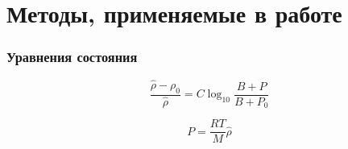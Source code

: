\section{Методы, применяемые в работе}
\begin{frame}
    \frametitle{Уравнения состояния}

    \begin{block}
         \begin{equation}
             \frac{\hat{\rho} - \rho_0}{\hat{\rho}} = C \log_{10}
             \frac{B + P}{B + P_0}
         \end{equation}
    \end{block}
    \begin{block}
\begin{equation}
    P = \frac{RT}{M} \hat{\rho}
\end{equation}
    \end{block}

\end{frame}

